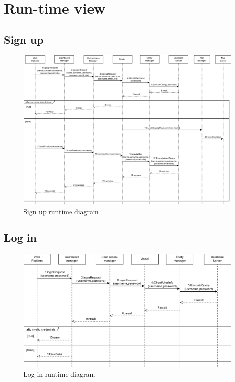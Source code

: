 \section{Run-time view}
\subsection*{Sign up}
\begin{figure}[h]
    \centering
    \includegraphics[width=\textwidth]{images/runtime/SignUp.png}
    \caption{Sign up runtime diagram}
    \label{fig:rt-signup}
\end{figure}
\clearpage

\subsection*{Log in}
\begin{figure}[h]
    \centering
    \includegraphics[width=\textwidth]{images/runtime/LogIn.png}
    \caption{Log in runtime diagram}
    \label{fig:rt-login}
\end{figure}

